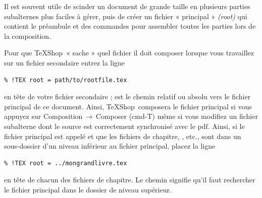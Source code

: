 \documentclass[11pt,french]{article}
\newcommand{\TS}{\textsf{\TeX Shop}}
\newcommand{\acr}[1]{\textsf{#1}}
\newcommand{\cmd}[1]{\textsf{#1}}
\newcommand{\mnu}[1]{\textsf{#1}}
\newcommand{\To}{\,\(\to\)\,}
\begin{document}
Il est souvent utile de scinder un document de grande taille en plusieurs parties subalternes plus faciles à gérer, puis de créer un fichier « principal » \emph{(root)} qui contient le préambule et des commandes \verb|| pour assembler toutes les parties lors de la composition.

Pour que \TS\ « sache » quel fichier il doit composer lorsque vous travaillez sur un fichier secondaire entrez la ligne \begin{verbatim}
% !TEX root = path/to/rootfile.tex
\end{verbatim}
en tête de votre fichier secondaire ;  est le chemin relatif ou absolu vers le fichier principal de ce document. Ainsi, \TS\ composera le fichier principal si vous appuyez sur \mnu{Composition}\To\mnu{Composer} (\cmd{cmd-T}) même si vous modifiez un fichier subalterne dont le source est correctement synchronisé avec le \acr{pdf}. Ainsi, si le fichier principal est appelé  et que les fichiers de chapitre, , etc., sont dans un sous-dossier  d'un niveau inférieur au fichier principal, placez la ligne
\begin{verbatim}
% !TEX root = ../mongrandlivre.tex
\end{verbatim}
en tête de chacun des fichiers de chapitre. Le chemin  signifie qu'il faut rechercher le fichier principal dans le dossier de niveau supérieur.

%
\end{document}
